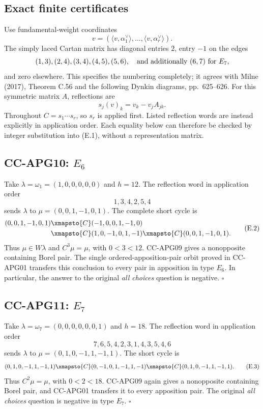 \subsection{Exact finite certificates}

Use fundamental-weight coordinates
\[
       v=(\langle v,\alpha_1^\vee\rangle,\ldots,
                          \langle v,\alpha_r^\vee\rangle).
\]
The simply laced Cartan matrix has diagonal entries \(2\), entry
\(-1\) on the edges
\[
     (1,3),(2,4),(3,4),(4,5),(5,6),
          \quad\hbox{and additionally }(6,7)\hbox{ for }E_7,
\]
and zero elsewhere. This specifies the numbering completely;
it agrees with Milne (2017), Theorem C.56 and the following
Dynkin diagrams, pp.~625--626.
For this symmetric matrix \(A\), reflections are
\[
               s_j(v)_k=v_k-v_j A_{jk}.                 \tag{E.1}
\]
Throughout \(C=s_1\cdots s_r\), so \(s_r\) is applied first.
Listed reflection words are instead explicitly in application
order. Each equality below can therefore be checked by integer
substitution into (E.1), without a representation matrix.

\subsection{CC-APG10: \(E_6\)}

Take \(\lambda=\omega_1=(1,0,0,0,0,0)\) and \(h=12\).
The reflection word in application order
\[
                           1,3,4,2,5,4
\]
sends \(\lambda\) to
\(\mu=(0,0,1,-1,0,1)\).
The complete short cycle is
\[
\begin{split}
 (0,0,1,-1,0,1)
     &\xmapsto{C}(-1,0,0,1,-1,0)\\
     &\xmapsto{C}(1,0,-1,0,1,-1)
       \xmapsto{C}(0,0,1,-1,0,1).
\end{split}                                                   \tag{E.2}
\]
Thus \(\mu\in W\lambda\) and \(C^3\mu=\mu\), with \(0<3<12\).
CC-APG09 gives a nonopposite containing Borel pair.
The single ordered-apposition-pair orbit proved in CC-APG01
transfers this conclusion to every pair in apposition in type
\(E_6\). In particular, the answer to the original
\emph{all choices} question is negative. \(\square\)

\subsection{CC-APG11: \(E_7\)}

Take \(\lambda=\omega_7=(0,0,0,0,0,0,1)\) and \(h=18\).
The reflection word in application order
\[
                         7,6,5,4,2,3,1,4,3,5,4,6
\]
sends \(\lambda\) to
\(\mu=(0,1,0,-1,1,-1,1)\).
The short cycle is
\[
  (0,1,0,-1,1,-1,1)
     \xmapsto{C}(0,-1,0,1,-1,1,-1)
     \xmapsto{C}(0,1,0,-1,1,-1,1).                         \tag{E.3}
\]
Thus \(C^2\mu=\mu\), with \(0<2<18\).
CC-APG09 again gives a nonopposite containing Borel pair,
and CC-APG01 transfers it to every apposition pair.
The original \emph{all choices} question is negative in type
\(E_7\). \(\square\)

